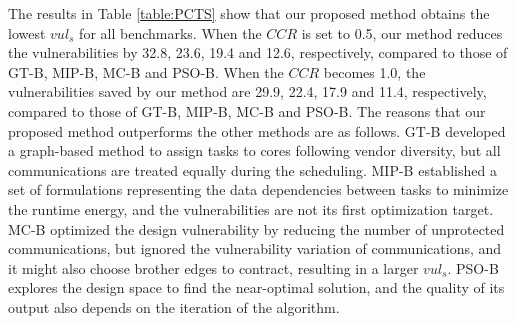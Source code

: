 \documentclass[10pt,journal, compsoc]{IEEEtran}
\begin{document}
The results in Table \ref{table:PCTS} show that our proposed method obtains the lowest $vul_s$ for all benchmarks. When the $CCR$ is set to 0.5, our method reduces the vulnerabilities by 32.8, 23.6, 19.4 and 12.6, respectively, compared to those of GT-B, MIP-B, MC-B and PSO-B. When the $CCR$ becomes 1.0, the vulnerabilities saved by our method are 29.9, 22.4, 17.9 and 11.4, respectively, compared to those of GT-B, MIP-B, MC-B and PSO-B. The reasons that our proposed method outperforms the other methods are as follows. GT-B developed a graph-based method to assign tasks to cores following vendor diversity, but all communications are treated equally during the scheduling. MIP-B established a set of formulations representing the data dependencies between tasks to minimize the runtime energy, and the vulnerabilities are not its first optimization target. MC-B optimized the design vulnerability by reducing the number of unprotected communications, but ignored the vulnerability variation of communications, and it might also choose brother edges to contract, resulting in a larger $vul_s$. PSO-B explores the design space to find the near-optimal solution, and the quality of its output also depends on the iteration of the algorithm.






\end{document}
